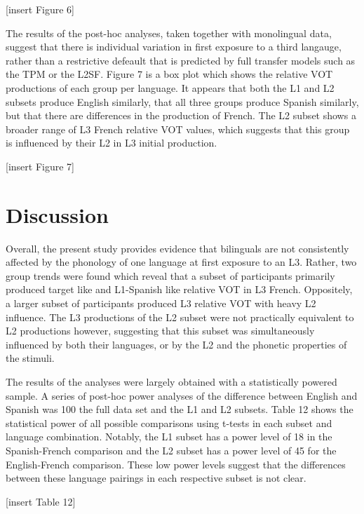\documentclass[
  english,
  man]{apa6}
\begin{document}
{[}insert Figure 6{]}

The results of the post-hoc analyses, taken together with monolingual data, suggest that there is individual variation in first exposure to a third langauge, rather than a restrictive defeault that is predicted by full transfer models such as the TPM or the L2SF.
Figure 7 is a box plot which shows the relative VOT productions of each group per language.
It appears that both the L1 and L2 subsets produce English similarly, that all three groups produce Spanish similarly, but that there are differences in the production of French.
The L2 subset shows a broader range of L3 French relative VOT values, which suggests that this group is influenced by their L2 in L3 initial production.

{[}insert Figure 7{]}

\hypertarget{discussion}{%
\section{Discussion}\label{discussion}}

Overall, the present study provides evidence that bilinguals are not consistently affected by the phonology of one language at first exposure to an L3.
Rather, two group trends were found which reveal that a subset of participants primarily produced target like and L1-Spanish like relative VOT in L3 French.
Oppositely, a larger subset of participants produced L3 relative VOT with heavy L2 influence. The L3 productions of the L2 subset were not practically equivalent to L2 productions however, suggesting that this subset was simultaneously influenced by both their languages, or by the L2 and the phonetic properties of the stimuli.

The results of the analyses were largely obtained with a statistically powered sample.
A series of post-hoc power analyses of the difference between English and Spanish was 100 the full data set and the L1 and L2 subsets.
Table 12 shows the statistical power of all possible comparisons using t-tests in each subset and language combination.
Notably, the L1 subset has a power level of 18 in the Spanish-French comparison and the L2 subset has a power level of 45 for the English-French comparison.
These low power levels suggest that the differences between these language pairings in each respective subset is not clear.

{[}insert Table 12{]}
\end{document}
